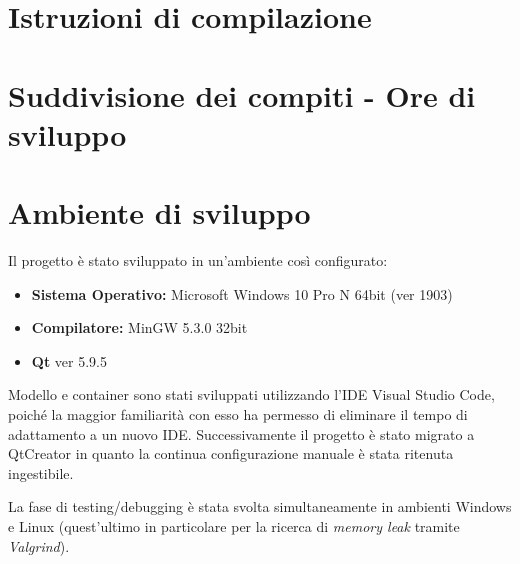 \documentclass[
]{article}
\providecommand{\tightlist}{%
  \setlength{\itemsep}{0pt}\setlength{\parskip}{0pt}}
\begin{document}
\hypertarget{istruzioni-di-compilazione}{%
\section{Istruzioni di compilazione}\label{istruzioni-di-compilazione}}

\hypertarget{suddivisione-dei-compiti---ore-di-sviluppo}{%
\section{Suddivisione dei compiti - Ore di
sviluppo}\label{suddivisione-dei-compiti---ore-di-sviluppo}}

\hypertarget{ambiente-di-sviluppo}{%
\section{Ambiente di sviluppo}\label{ambiente-di-sviluppo}}

Il progetto è stato sviluppato in un'ambiente così configurato:

\begin{itemize}
\tightlist
\item
  \textbf{Sistema Operativo:} Microsoft Windows 10 Pro N 64bit (ver
  1903)
\item
  \textbf{Compilatore:} MinGW 5.3.0 32bit
\item
  \textbf{Qt} ver 5.9.5
\end{itemize}

Modello e container sono stati sviluppati utilizzando l'IDE Visual
Studio Code, poiché la maggior familiarità con esso ha permesso di
eliminare il tempo di adattamento a un nuovo IDE. Successivamente il
progetto è stato migrato a QtCreator in quanto la continua
configurazione manuale è stata ritenuta ingestibile.

La fase di testing/debugging è stata svolta simultaneamente in ambienti
Windows e Linux (quest'ultimo in particolare per la ricerca di
\emph{memory leak} tramite \emph{Valgrind}).
\end{document}
